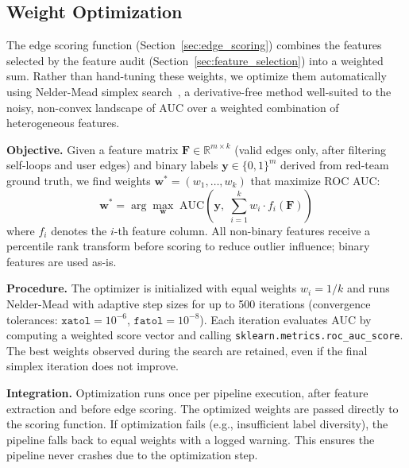 
\subsection{Weight Optimization}
\label{sec:weight_optimization}

The edge scoring function (Section~\ref{sec:edge_scoring}) combines the features selected by the feature audit (Section~\ref{sec:feature_selection}) into a weighted sum. Rather than hand-tuning these weights, we optimize them automatically using Nelder-Mead simplex search~\cite{neldermead1965}, a derivative-free method well-suited to the noisy, non-convex landscape of AUC over a weighted combination of heterogeneous features.

\textbf{Objective.}
Given a feature matrix $\mathbf{F} \in \mathbb{R}^{m \times k}$ (valid edges only, after filtering self-loops and user edges) and binary labels $\mathbf{y} \in \{0,1\}^m$ derived from red-team ground truth, we find weights $\mathbf{w}^* = (w_1, \dots, w_k)$ that maximize ROC AUC:
\begin{equation}
\mathbf{w}^* = \arg\max_{\mathbf{w}} \; \text{AUC}\!\left(\mathbf{y},\; \sum_{i=1}^{k} w_i \cdot f_i(\mathbf{F})\right)
\end{equation}
where $f_i$ denotes the $i$-th feature column. All non-binary features receive a percentile rank transform before scoring to reduce outlier influence; binary features are used as-is.

\textbf{Procedure.}
The optimizer is initialized with equal weights $w_i = 1/k$ and runs Nelder-Mead with adaptive step sizes for up to 500 iterations (convergence tolerances: $\texttt{xatol} = 10^{-6}$, $\texttt{fatol} = 10^{-8}$). Each iteration evaluates AUC by computing a weighted score vector and calling \texttt{sklearn.metrics.roc\_auc\_score}. The best weights observed during the search are retained, even if the final simplex iteration does not improve.

\textbf{Integration.}
Optimization runs once per pipeline execution, after feature extraction and before edge scoring. The optimized weights are passed directly to the scoring function. If optimization fails (e.g., insufficient label diversity), the pipeline falls back to equal weights with a logged warning. This ensures the pipeline never crashes due to the optimization step.

